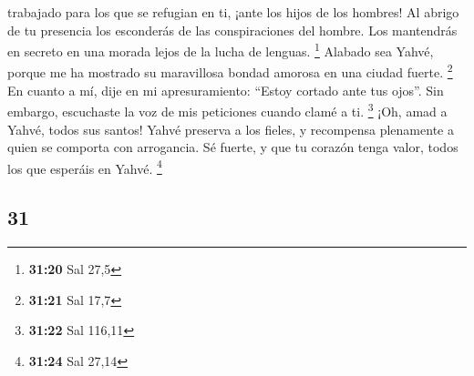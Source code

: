 \begin{paracol}{2}
trabajado para los que se refugian en ti, ¡ante los hijos de los
hombres!  Al abrigo de tu presencia los esconderás de las
conspiraciones del hombre. Los mantendrás en secreto en una morada lejos
de la lucha de lenguas. \footnote{\textbf{31:20} Sal 27,5}
 Alabado sea Yahvé, porque me ha mostrado su maravillosa
bondad amorosa en una ciudad fuerte. \footnote{\textbf{31:21} Sal 17,7}
 En cuanto a mí, dije en mi apresuramiento: ``Estoy
cortado ante tus ojos''. Sin embargo, escuchaste la voz de mis
peticiones cuando clamé a ti. \footnote{\textbf{31:22} Sal 116,11}
 ¡Oh, amad a Yahvé, todos sus santos! Yahvé preserva a
los fieles, y recompensa plenamente a quien se comporta con arrogancia.
 Sé fuerte, y que tu corazón tenga valor, todos los que
esperáis en Yahvé. \footnote{\textbf{31:24} Sal 27,14}

\switchcolumn
\begin{otherlanguage}{english}

\hypertarget{section-61}{%
\section{31}\label{section-61}}


\end{otherlanguage}
\end{paracol}
